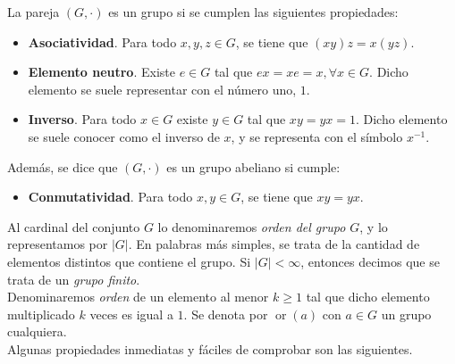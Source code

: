 \begin{definicion}
	La pareja $(G, \cdot)$ es un grupo si se cumplen las siguientes propiedades:
	
	\begin{itemize}
		\item \textbf{Asociatividad}. Para todo $x, y, z \in G$, se tiene que $(xy)z = x(yz)$.
		
		\item \textbf{Elemento neutro}. Existe $e \in G$ tal que $ex = xe = x, \forall x \in G$. Dicho elemento se suele representar con el número uno, $1$.
		
		\item \textbf{Inverso}. Para todo $x \in G$ existe $y \in G$ tal que $xy = yx = 1$. Dicho elemento se suele conocer como el inverso de $x$, y se representa con el símbolo $x^{-1}$.
	\end{itemize}
	
	Además, se dice que $(G, \cdot)$ es un grupo abeliano si cumple:
	
	\begin{itemize}
		\item \textbf{Conmutatividad}. Para todo $x, y \in G$, se tiene que $xy = yx$.
	\end{itemize}
\end{definicion}

Al cardinal del conjunto $G$ lo denominaremos \textit{orden del grupo $G$}, y lo representamos por $|G|$. En palabras más simples, se trata de la cantidad de elementos distintos que contiene el grupo. Si $|G| < \infty$, entonces decimos que se trata de un \textit{grupo finito}.\\

Denominaremos \textit{orden} de un elemento al menor $k \geq 1$ tal que dicho elemento multiplicado $k$ veces es igual a $1$. Se denota por $\mathop{or}(a)$ con $a \in G$ un grupo cualquiera.\\

Algunas propiedades inmediatas y fáciles de comprobar son las siguientes.

